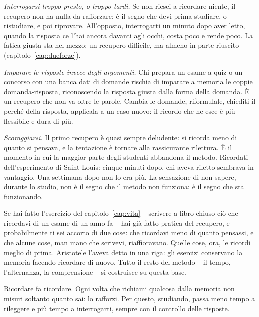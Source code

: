 \emph{Interrogarsi troppo presto, o troppo tardi.} Se non riesci a
ricordare niente, il recupero non ha nulla da rafforzare: è il segno
che devi prima studiare, o ristudiare, e poi riprovare. All'opposto,
interrogarti un minuto dopo aver letto, quando la risposta ce l'hai
ancora davanti agli occhi, costa poco e rende poco. La fatica giusta
sta nel mezzo: un recupero difficile, ma almeno in parte riuscito
(capitolo~\ref{cap:dueforze}).

\emph{Imparare le risposte invece degli argomenti.} Chi prepara un
esame a quiz o un concorso con una banca dati di domande rischia di
imparare a memoria le coppie domanda-risposta, riconoscendo la risposta
giusta dalla forma della domanda. È un recupero che non va oltre le
parole. Cambia le domande, riformulale, chiediti il perché della
risposta, applicala a un caso nuovo: il ricordo che ne esce è più
flessibile e dura di più.

\emph{Scoraggiarsi.} Il primo recupero è quasi sempre deludente: si
ricorda meno di quanto si pensava, e la tentazione è tornare alla
rassicurante rilettura. È il momento in cui la maggior parte degli
studenti abbandona il metodo. Ricordati dell'esperimento di Saint
Louis: cinque minuti dopo, chi aveva riletto sembrava in vantaggio. Una
settimana dopo non lo era più. La sensazione di non sapere, durante lo
studio, non è il segno che il metodo non funziona: è il segno che sta
funzionando.

\asterismo

Se hai fatto l'esercizio del capitolo~\ref{cap:vita} -- scrivere a
libro chiuso ciò che ricordavi di un esame di un anno fa -- hai già
fatto pratica del recupero, e probabilmente ti sei accorto di due cose:
che ricordavi meno di quanto pensassi, e che alcune cose, man mano che
scrivevi, riaffioravano. Quelle cose, ora, le ricordi meglio di prima.
Aristotele l'aveva detto in una riga: gli esercizi conservano la
memoria facendo ricordare di nuovo. Tutto il resto del metodo -- il
tempo, l'alternanza, la comprensione -- si costruisce su questa base.

\begin{daricordare}
Ricordare fa ricordare. Ogni volta che richiami qualcosa dalla memoria
non misuri soltanto quanto sai: lo rafforzi. Per questo, studiando,
passa meno tempo a rileggere e più tempo a interrogarti, sempre con il
controllo delle risposte.
\end{daricordare}

